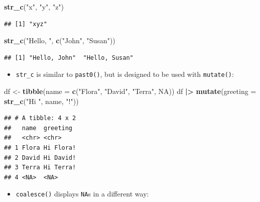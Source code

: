 \documentclass[
]{article}
\newenvironment{Shaded}{\begin{snugshade}}{\end{snugshade}}
\newcommand{\AttributeTok}[1]{\textcolor[rgb]{0.13,0.29,0.53}{#1}}
\newcommand{\ConstantTok}[1]{\textcolor[rgb]{0.56,0.35,0.01}{#1}}
\newcommand{\FunctionTok}[1]{\textcolor[rgb]{0.13,0.29,0.53}{\textbf{#1}}}
\newcommand{\NormalTok}[1]{#1}
\newcommand{\OtherTok}[1]{\textcolor[rgb]{0.56,0.35,0.01}{#1}}
\newcommand{\SpecialCharTok}[1]{\textcolor[rgb]{0.81,0.36,0.00}{\textbf{#1}}}
\newcommand{\StringTok}[1]{\textcolor[rgb]{0.31,0.60,0.02}{#1}}
\providecommand{\tightlist}{%
  \setlength{\itemsep}{0pt}\setlength{\parskip}{0pt}}
\begin{document}
\begin{Shaded}
\begin{Highlighting}[]
\FunctionTok{str\_c}\NormalTok{(}\StringTok{"x"}\NormalTok{, }\StringTok{"y"}\NormalTok{, }\StringTok{"z"}\NormalTok{)}
\end{Highlighting}
\end{Shaded}

\begin{verbatim}
## [1] "xyz"
\end{verbatim}

\begin{Shaded}
\begin{Highlighting}[]
\FunctionTok{str\_c}\NormalTok{(}\StringTok{"Hello, "}\NormalTok{, }\FunctionTok{c}\NormalTok{(}\StringTok{"John"}\NormalTok{, }\StringTok{"Susan"}\NormalTok{))}
\end{Highlighting}
\end{Shaded}

\begin{verbatim}
## [1] "Hello, John"  "Hello, Susan"
\end{verbatim}

\begin{itemize}
\tightlist
\item
  \texttt{str\_c} is similar to \texttt{past0()}, but is designed to be
  used with \texttt{mutate()}:
\end{itemize}

\begin{Shaded}
\begin{Highlighting}[]
\NormalTok{df }\OtherTok{\textless{}{-}} \FunctionTok{tibble}\NormalTok{(}\AttributeTok{name =} \FunctionTok{c}\NormalTok{(}\StringTok{"Flora"}\NormalTok{, }\StringTok{"David"}\NormalTok{, }\StringTok{"Terra"}\NormalTok{, }\ConstantTok{NA}\NormalTok{))}
\NormalTok{df }\SpecialCharTok{|\textgreater{}} 
  \FunctionTok{mutate}\NormalTok{(}\AttributeTok{greeting =} \FunctionTok{str\_c}\NormalTok{(}\StringTok{"Hi "}\NormalTok{, name, }\StringTok{"!"}\NormalTok{))}
\end{Highlighting}
\end{Shaded}

\begin{verbatim}
## # A tibble: 4 x 2
##   name  greeting 
##   <chr> <chr>    
## 1 Flora Hi Flora!
## 2 David Hi David!
## 3 Terra Hi Terra!
## 4 <NA>  <NA>
\end{verbatim}

\begin{itemize}
\tightlist
\item
  \texttt{coalesce()} displays \texttt{NA}s in a different way:
\end{itemize}
\end{document}
